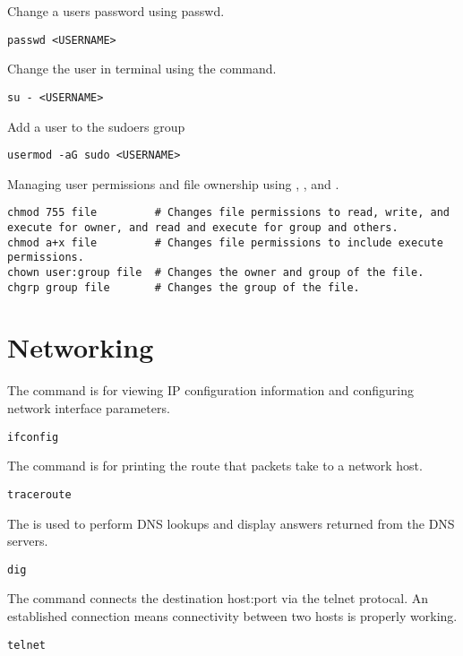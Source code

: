 Change a users password using passwd.
\begin{lstlisting}
passwd <USERNAME>
\end{lstlisting}

Change the user in terminal using the  command.
\begin{lstlisting}
su - <USERNAME>
\end{lstlisting}

Add a user to the sudoers group
\begin{lstlisting}
usermod -aG sudo <USERNAME>
\end{lstlisting}

Managing user permissions and file ownership using , , and .
\begin{lstlisting}
chmod 755 file         # Changes file permissions to read, write, and execute for owner, and read and execute for group and others.
chmod a+x file         # Changes file permissions to include execute permissions.
chown user:group file  # Changes the owner and group of the file.
chgrp group file       # Changes the group of the file.
\end{lstlisting}












\section{Networking}

The  command is for viewing IP configuration information and configuring network interface parameters.
\begin{lstlisting}
ifconfig
\end{lstlisting}

The  command is for printing the route that packets take to a network host.
\begin{lstlisting}
traceroute
\end{lstlisting}

The  is used to perform DNS lookups and display answers returned from the DNS servers.
\begin{lstlisting}
dig
\end{lstlisting}

The  command connects the destination host:port via the telnet protocal. An established connection means connectivity between two hosts is properly working.
\begin{lstlisting}
telnet
\end{lstlisting}

